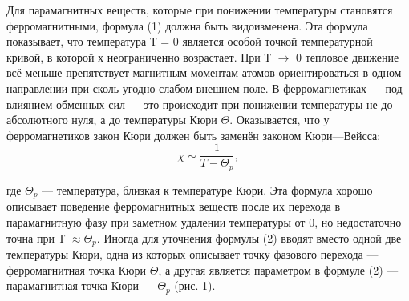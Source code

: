 \documentclass[a4paper,12pt]{article}
\begin{document}
\par Для парамагнитных веществ, которые при понижении температуры становятся ферромагнитными, формула (1) должна быть видоизменена. Эта формула показывает, что температура Т = 0 является особой точкой температурной кривой, в которой х неограниченно возрастает.
При Т $\to$ 0 тепловое движение всё меньше препятствует магнитным моментам атомов ориентироваться в одном направлении при сколь угодно слабом внешнем поле. В ферромагнетиках — под влиянием обменных сил — это происходит при понижении температуры не до абсолютного нуля, а до температуры Кюри $\Theta$. Оказывается, что у ферромагнетиков закон Кюри должен быть заменён законом Кюри—Вейсса:
\begin{equation}
\chi \sim \frac{1}{T-\Theta_p},
\end{equation}
\par где $\Theta_p$ — температура, близкая к температуре
Кюри.
Эта формула хорошо описывает поведение ферромагнитных веществ после их перехода в парамагнитную фазу при заметном удалении температуры от 0, но недостаточно точна при Т $\approx \Theta_p$.
Иногда для уточнения формулы (2) вводят вместо одной две температуры Кюри, одна из которых описывает точку фазового перехода — ферромагнитная точка Кюри $\Theta$, а другая является параметром в формуле (2) — парамагнитная точка Кюри — $\Theta_p$ (рис. 1).
\end{document}
